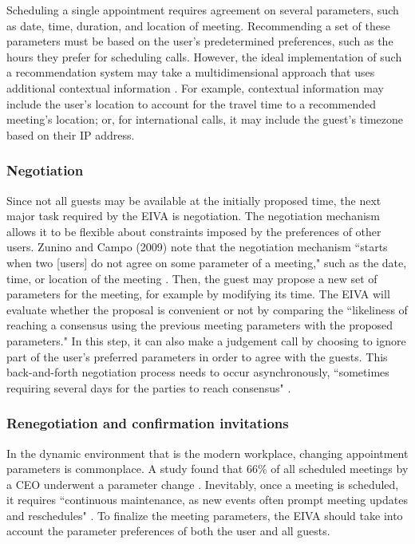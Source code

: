 \documentclass{article}
\begin{document}
Scheduling a single appointment requires agreement on several parameters, such as date, time, duration, and location of meeting. Recommending a set of these parameters must be based on the user's predetermined preferences, such as the hours they prefer for scheduling calls. However, the ideal implementation of such a recommendation system may take a multidimensional approach that uses additional contextual information \cite{adomavicius_incorporating_2005}. For example, contextual information may include the user's location to account for the travel time to a recommended meeting's location; or, for international calls, it may include the guest's timezone based on their IP address.

\subsubsection{Negotiation}

Since not all guests may be available at the initially proposed time, the next major task required by the EIVA is negotiation. The negotiation mechanism allows it to be flexible about constraints imposed by the preferences of other users. Zunino and Campo (2009) note that the negotiation mechanism ``starts when two [users] do not agree on some parameter of a meeting," such as the date, time, or location of the meeting \cite{zunino_chronos:_2009}. Then, the guest may propose a new set of parameters for the meeting, for example by modifying its time. The EIVA will evaluate whether the proposal is convenient or not by comparing the ``likeliness of reaching a consensus using the previous meeting parameters with the proposed parameters." In this step, it can also make a judgement call by choosing to ignore part of the user's preferred parameters in order to agree with the guests. This back-and-forth negotiation process needs to occur asynchronously, ``sometimes requiring several days for the parties to reach consensus" \cite{cranshaw_calendar.help:_2017}.

\subsubsection{Renegotiation and confirmation invitations}

In the dynamic environment that is the modern workplace, changing appointment parameters is commonplace. A study found that 66\% of all scheduled meetings by a CEO underwent a parameter change \cite{dennis_how_2018}. Inevitably, once a meeting is scheduled, it requires ``continuous maintenance, as new events often prompt meeting updates and reschedules" \cite{cranshaw_calendar.help:_2017}. To finalize the meeting parameters, the EIVA should take into account the parameter preferences of both the user and all guests.
\end{document}

